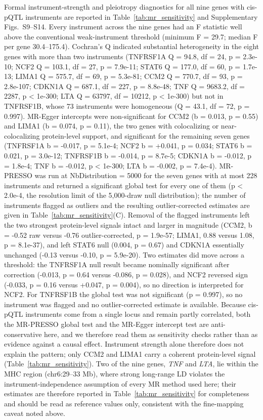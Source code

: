 \documentclass[11pt,a4paper]{article}
\begin{document}


Formal instrument-strength and pleiotropy diagnostics for all nine genes with
cis-pQTL instruments are reported in Table~\ref{tab:mr_sensitivity} and
Supplementary Figs.~S9--S14. Every instrument across the nine genes had an F
statistic well above the conventional weak-instrument threshold (minimum
F = 29.7; median F per gene 30.4--175.4). Cochran's Q indicated substantial
heterogeneity in the eight genes with more than two instruments (TNFRSF1A
Q = 94.8, df = 24, p = 2.3e-10; NCF2 Q = 103.1, df = 27, p = 7.9e-11; STAT6
Q = 177.0, df = 60, p = 1.7e-13; LIMA1 Q = 575.7, df = 69, p = 5.3e-81; CCM2
Q = 770.7, df = 93, p = 2.8e-107; CDKN1A Q = 687.1, df = 227, p = 8.8e-48; TNF
Q = 9683.2, df = 2287, p < 1e-300; LTA Q = 63797, df = 10212, p < 1e-300) but
not in TNFRSF1B, whose 73 instruments were homogeneous (Q = 43.1, df = 72,
p = 0.997). MR-Egger intercepts were non-significant for CCM2 (b = 0.013,
p = 0.55) and LIMA1 (b = 0.074, p = 0.11), the two genes with colocalizing or
near-colocalizing protein-level support, and significant for the remaining seven
genes (TNFRSF1A b = -0.017, p = 5.1e-4; NCF2 b = +0.041, p = 0.034; STAT6
b = 0.021, p = 3.0e-12; TNFRSF1B b = -0.014, p = 8.7e-5; CDKN1A b = -0.012,
p = 1.8e-4; TNF b = -0.012, p < 1e-300; LTA b = -0.002, p = 7.4e-4). MR-PRESSO
was run at NbDistribution = 5000 for the seven genes with at most 228
instruments and returned a significant global test for every one of them
(p < 2.0e-4, the resolution limit of the 5,000-draw null distribution); the
number of instruments flagged as outliers and the resulting outlier-corrected
estimates are given in Table~\ref{tab:mr_sensitivity}(C). Removal of the
flagged instruments left the two strongest protein-level signals intact and
larger in magnitude (CCM2, b = -0.52 raw versus -0.76 outlier-corrected,
p = 1.9e-57; LIMA1, 0.88 versus 1.08, p = 8.1e-37), and left STAT6 null
(0.004, p = 0.67) and CDKN1A essentially unchanged (-0.13 versus -0.10,
p = 5.9e-20). Two estimates did move across a threshold: the TNFRSF1A null
result became nominally significant after correction (-0.013, p = 0.64 versus
-0.086, p = 0.028), and NCF2 reversed sign (-0.033, p = 0.16 versus +0.047,
p = 0.004), so no direction is interpreted for NCF2. For TNFRSF1B the global
test was not significant (p = 0.997), so no instrument was flagged and no
outlier-corrected estimate is available. Because cis-pQTL instruments come from a
single locus and remain partly correlated, both the MR-PRESSO global test and the
MR-Egger intercept test are anti-conservative here, and we therefore read them as
sensitivity checks rather than as evidence against a causal effect. Instrument
strength alone therefore does not explain the pattern; only CCM2 and LIMA1 carry
a coherent protein-level signal (Table~\ref{tab:mr_sensitivity}). Two of the nine
genes, \textit{TNF} and \textit{LTA}, lie within the MHC region (chr6:29--33 Mb),
where strong long-range LD violates the instrument-independence assumption of
every MR method used here; their estimates are therefore reported in
Table~\ref{tab:mr_sensitivity} for completeness and should be read as reference
values only, consistent with the fine-mapping caveat noted above.
\end{document}
